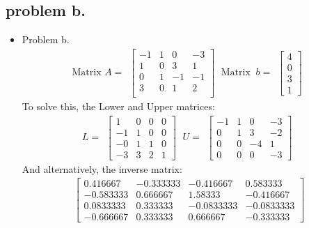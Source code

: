 \documentclass[12pt]{beamer}
\begin{document}
\subsection{problem b.}
\begin{frame}
\begin{itemize}
\item Problem b.
\begin{equation*}
\textrm{Matrix }A =
\begin{matrix}
	\begin{bmatrix}
	-1 & 1 & 0 & -3\\ 1 & 0 & 3 & 1 \\ 0 & 1 & -1 & -1 \\ 3 & 0 & 1 & 2\\ 
	\end{bmatrix}
\end{matrix}
\ \textrm{Matrix }\ b =
\begin{matrix}
	\begin{bmatrix}
	4 \\ 0 \\ 3 \\ 1
	\end{bmatrix}
\end{matrix}
\end{equation*}
To solve this, the Lower and Upper matrices:
\begin{equation*}
L =
\begin{matrix}
	\begin{bmatrix}
	1 &	0 &	0 &	0\\	-1 &	1 &	0 &	0\\	-0 &	1 &	1 &	0\\ -3 & 3 &	2 &	1
	\end{bmatrix}
\end{matrix}
\ U =
\begin{matrix}
	\begin{bmatrix}
	-1 & 1 & 0 & -3\\	
	 0 & 1 & 3 & -2\\
	 0 & 0 & -4 & 1\\
	 0 & 0 & 0 & -3
	\end{bmatrix}
\end{matrix}
\end{equation*}
And alternatively, the inverse matrix:
\begin{equation*}
\begin{matrix}
	\begin{bmatrix}
0.416667 &	-0.333333 &	-0.416667 &	0.583333\\	
-0.583333 &	0.666667 &	1.58333 &	-0.416667\\
0.0833333 &	0.333333 &	-0.0833333 & -0.0833333\\	
-0.666667 &	0.333333 &	0.666667 &	-0.333333	
	\end{bmatrix}
\end{matrix}
\end{equation*}
\end{itemize}
\end{frame}
\end{document}

